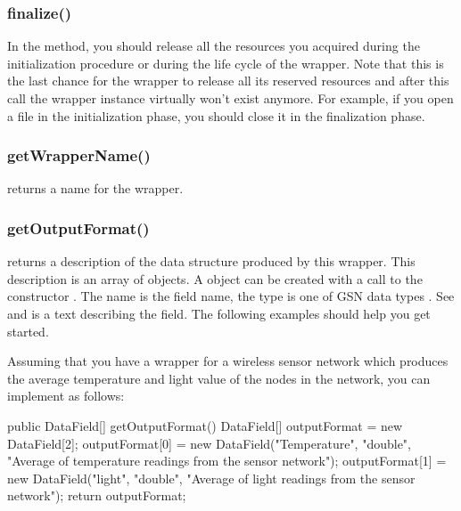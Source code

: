 \subsubsection {finalize()}
In the  method, you should release all the resources
you acquired during the initialization procedure or during the life cycle of the
wrapper. Note that this is the last chance for the wrapper to release all its
reserved resources and after this call the wrapper instance virtually won't exist
anymore.
For example, if you open a file in the initialization phase, you should close
it in the finalization phase.

\subsubsection {getWrapperName()}
 returns a name for the wrapper.

\subsubsection {getOutputFormat()}
 returns a description of
the data structure produced by this wrapper.
This description is an array of  objects. A  object
can be created with a call to the constructor . The name is the field name, the type
is one of GSN data types . See  and
 is a text describing the field.
The following examples should help you get started.

Assuming that you have a wrapper for a wireless sensor network which produces
the average temperature and light value of the nodes in the network, you can
implement  as follows:

\begin{javacode}
	public DataField[] getOutputFormat() {
		DataField[] outputFormat = new DataField[2];
		outputFormat[0] = new DataField("Temperature", "double",
			"Average of temperature readings from the sensor network");
		outputFormat[1] = new DataField("light", "double",
			"Average of light readings from the sensor network");
		return outputFormat;
	}
\end{javacode}


